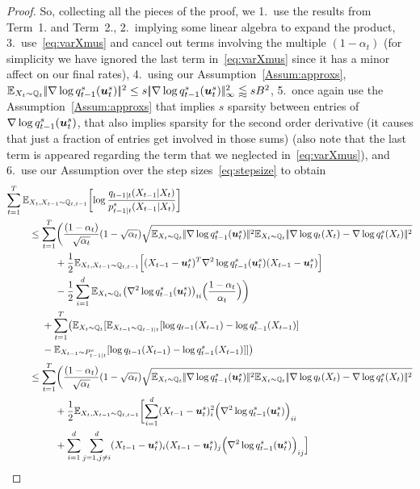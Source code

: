 \begin{proof}
So, collecting all the pieces of the proof, we  1.~use the results from Term~1. and Term~2.,  2.~implying some linear algebra to expand the product, 3.~use~\eqref{eq:varXmus} and cancel out terms involving the multiple $(1-\alpha_t)$ (for simplicity we have ignored the last term in~\eqref{eq:varXmus} since it has a minor affect on our final rates), 4.~using our Assumption~\eqref{Assum:approxs}, $\textcolor{black}{\mathbb{E}}_{X_t\sim \mathbb{Q}_{t}}|\!|
    \nabla\log q^s_{t-1}(\boldsymbol{u}^s_t)|\!|^2 \le s |\!|\nabla\log q^s_{t-1}(\boldsymbol{u}^s_t)|\!|_{\infty}^2\lessapprox s  B^2 $, 5.~once again use the Assumption~\eqref{Assum:approxs} that implies  $s$ sparsity between entries of $
    \nabla\log q^s_{t-1}(\boldsymbol{u}^s_t)$, that also implies sparsity for the second order derivative (it causes that just a fraction of entries get involved in those sums) (also note that the last term is appeared regarding the term that we neglected in~\eqref{eq:varXmus}), and  6.~use our Assumption over the step sizes~\eqref{eq:stepsize} to obtain 
\allowdisplaybreaks
\begingroup
     \begin{align*}
       \sum_{t=1}^T\E&_{X_t,X_{t-1}\sim \Fd_{t,t-1}}\biggl[\log\frac{\Fdd_{t-1|t}(X_{t-1}|X_t)}{\Bdd^s_{t-1|t}(X_{t-1}|X_t)}\biggr]\\
       &\le \sum_{t=1}^T\biggl(\frac{(1-\alpha_t)}{\sqrt{\alpha_t}}(1-\sqrt{\alpha_t})\sqrt{\E_{X_t\sim \Fd_{t}}\norm{
    \nabla\log \Fdds_{t-1}(\us_t)}^2\E_{X_t\sim \Fd_{t}}\norm{\nabla\log \Fdd_t(X_t)-\nabla\log \Fdds_t(X_t)}^2}\\
    &~~~~~~~~+\frac{1}{2}\E_{X_t,X_{t-1}\sim \Fd_{t,t-1}}
    \Bigl[(X_{t-1}-\us_t)^T \nabla^2\log \Fdds_{t-1}(\us_t)(X_{t-1}-\us_t)\Bigr]\\
       &~~~~~~~~-\frac{1}{2}\sum_{i=1}^{\Dim}  \E_{X_t\sim \Fd_{t}} \bigl(\nabla^2\log \Fdds_{t-1}(\us_t)\bigr)_{ii}\Bigl(\frac{1-\alpha_t}{\alpha_t}\Bigr)\biggr) \\
       &~~~~+\sum_{t=1}^{T}\bigl(\E_{X_{t}\sim \Fd_{t}}[\E_{X_{t-1}\sim \Fd_{t-1|t}}[\log \Fdd_{t-1}(X_{t-1})-\log \Fdds_{t-1}(X_{t-1})]\\
    &~~~~-\E_{X_{t-1}\sim \Bds_{t-1|t}}[\log \Fdd_{t-1}(X_{t-1})-\log \Fdds_{t-1}(X_{t-1})]]\bigr)\\
       &\le \sum_{t=1}^T \biggl(\frac{(1-\alpha_t)}{\sqrt{\alpha_t}}(1-\sqrt{\alpha_t})\sqrt{\E_{X_t\sim \Fd_{t}}\norm{
    \nabla\log \Fdds_{t-1}(\us_t)}^2\E_{X_t\sim \Fd_{t}}\norm{\nabla\log \Fdd_t(X_t)-\nabla\log \Fdds_t(X_t)}^2}\\
    &~~~~~~~~+\frac{1}{2}\E_{X_t,X_{t-1}\sim \Fd_{t,t-1}}
    \biggl[\sum_{i=1}^{\Dim}(X_{t-1}-\us_t)_i^2 \Bigl(\nabla^2\log \Fdds_{t-1}(\us_t)\Bigr)_{ii}\\   &~~~~~~~~+\sum_{i=1}^{\Dim}\sum_{j=1,j\ne i}^{\Dim}(X_{t-1}-\us_t)_i(X_{t-1}-\us_t)_j \Bigl(\nabla^2\log \Fdds_{t-1}(\us_t)\Bigr)_{ij}\Bigr]\\

\end{align*}
\end{proof}
